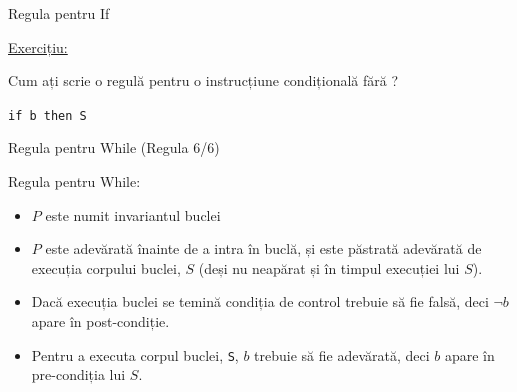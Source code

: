 \begin{frame}{Regula pentru If}

{\color{red}\underline{Exercițiu:}}

Cum ați scrie o regulă pentru o instrucțiune condițională fără ?
\begin{center}
\texttt{if b then S}
\end{center}

\end{frame}

\begin{frame}{Regula pentru While (Regula 6/6)}

\vspace{-.6cm}
\alert{Regula pentru While:}
\begin{center}
\end{center}

\pause
\begin{itemize}
	\item $P$ este numit \alert{invariantul buclei}
	\item $P$ este adevărată înainte de a intra în buclă, și este păstrată adevărată de execuția corpului buclei, $S$ (deși nu neapărat și în timpul execuției lui $S$).
	\item Dacă execuția buclei se temină condiția de control trebuie să fie falsă, deci $\neg b$ apare în post-condiție.
	\item Pentru a executa corpul buclei, \texttt{S}, $b$ trebuie să fie adevărată, deci $b$ apare în pre-condiția lui $S$.
\end{itemize}
\end{frame}

